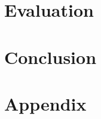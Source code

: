 \documentclass[a4paper,12pt]{report}
\begin{document}
\chapter{Evaluation}

\chapter{Conclusion}


\appendix

\chapter{Appendix}


\printbibliography

\end{document}
